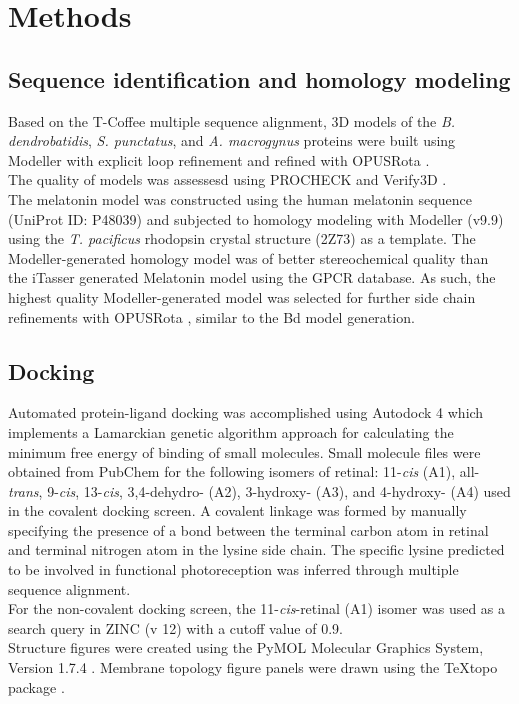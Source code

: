 \section{Methods}
\subsection*{Sequence identification and homology modeling}
Based on the T-Coffee multiple sequence alignment, 3D models of the \textit{B. dendrobatidis}, \textit{S. punctatus}, and \textit{A. macrogynus} proteins were built using Modeller \cite{Eswar2007} with explicit loop refinement and refined with OPUSRota \cite{Lu2008}.\\ 
\indent The quality of models was assessesd using PROCHECK \cite{Laskowski1993,Wiederstein2007} and Verify3D \cite{Luthy1992}.\\
\indent The melatonin model was constructed using the human melatonin sequence (UniProt ID: P48039) and subjected to homology modeling with Modeller (v9.9) \cite{Eswar2007} using the \textit{T. pacificus} rhodopsin crystal structure (2Z73) as a template. The Modeller-generated homology model was of better stereochemical quality than the iTasser generated Melatonin model using the GPCR database. As such, the highest quality Modeller-generated model was selected for further side chain refinements with OPUSRota \cite{Lu2008}, similar to the Bd model generation.\\
\subsection*{Docking}
\indent Automated protein-ligand docking was accomplished using Autodock 4 \cite{Morris2009} which implements a Lamarckian genetic algorithm approach for calculating the minimum free energy of binding of small molecules. Small molecule files were obtained from PubChem \cite{Bolton2008} for the following isomers of retinal: 11-\textit{cis} (A1), all-\textit{trans}, 9-\textit{cis}, 13-\textit{cis}, 3,4-dehydro- (A2), 3-hydroxy- (A3), and 4-hydroxy- (A4) used in the covalent docking screen. A covalent linkage was formed by manually specifying the presence of a bond between the terminal carbon atom in retinal and terminal nitrogen atom in the lysine side chain. The specific lysine predicted to be involved in functional photoreception was inferred through multiple sequence alignment.\\
\indent For the non-covalent docking screen, the 11-\textit{cis}-retinal (A1) isomer was used as a search query in ZINC (v 12) \cite{Irwin2005} with a cutoff value of 0.9.\\
\indent Structure figures were created using the PyMOL Molecular Graphics System, Version 1.7.4 \cite{PyMOL}. Membrane topology figure panels were drawn using the {\TeX}topo package \cite{Beitz2000}.\\
